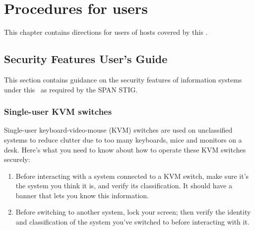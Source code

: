 %
%
%
\chapter{Procedures for users}
\label{ProceduresForUsers}

This chapter contains directions for users of hosts covered by this
\CMITSPolicy .



\section{Security Features User's Guide}
\label{SFUG}

This section contains guidance on the security features of information
systems under this \CMITSPolicy\ as required by the SPAN STIG.

\subsection{Single-user KVM switches}

Single-user keyboard-video-mouse (KVM) switches are used on unclassified
systems to reduce clutter due to too many keyboards, mice and monitors on
a desk.  Here's what you need to know
about how to operate these KVM switches securely:

\begin{enumerate}
\item Before interacting with a system connected to a KVM switch, make
    sure it's the system you think it is, and verify its classification.
    It should have a banner that lets you know this information.
\item Before switching to another system, lock your screen; then verify
    the identity and classification of the system you've switched to
    before interacting with it.
\end{enumerate}

